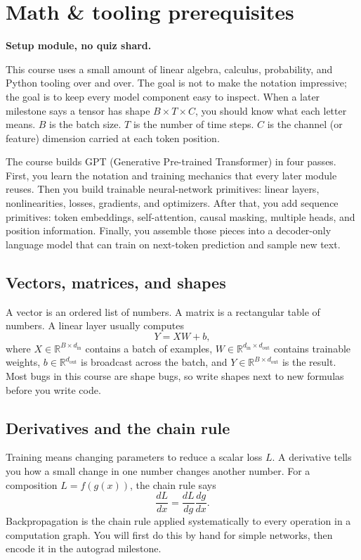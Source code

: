 \section{Math \& tooling prerequisites}\label{sec:00}
\noindent\textbf{Setup module, no quiz shard.}

This course uses a small amount of linear algebra, calculus, probability, and
Python tooling over and over. The goal is not to make the notation impressive;
the goal is to keep every model component easy to inspect. When a later
milestone says a tensor has shape $B \times T \times C$, you should know what
each letter means. $B$ is the batch size. $T$ is the number of time steps. $C$
is the channel (or feature) dimension carried at each token position.

The course builds GPT (Generative Pre-trained Transformer) in four passes.
First, you learn the notation and
training mechanics that every later module reuses. Then you build trainable
neural-network primitives: linear layers, nonlinearities, losses, gradients, and
optimizers. After that, you add sequence primitives: token embeddings,
self-attention, causal masking, multiple heads, and position information.
Finally, you assemble those pieces into a decoder-only language model that can
train on next-token prediction and sample new text.

\subsection*{Vectors, matrices, and shapes}
A vector is an ordered list of numbers. A matrix is a rectangular table of
numbers. A linear layer usually computes
\[
  Y = XW + b,
\]
where $X \in \mathbb{R}^{B \times d_{\text{in}}}$ contains a batch of examples,
$W \in \mathbb{R}^{d_{\text{in}} \times d_{\text{out}}}$ contains trainable
weights, $b \in \mathbb{R}^{d_{\text{out}}}$ is broadcast across the batch, and
$Y \in \mathbb{R}^{B \times d_{\text{out}}}$ is the result. Most bugs in this
course are shape bugs, so write shapes next to new formulas before you write
code.

\subsection*{Derivatives and the chain rule}
Training means changing parameters to reduce a scalar loss $L$. A derivative
tells you how a small change in one number changes another number. For a
composition $L=f(g(x))$, the chain rule says
\[
  \frac{dL}{dx} = \frac{dL}{dg}\frac{dg}{dx}.
\]
Backpropagation is the chain rule applied systematically to every operation in
a computation graph. You will first do this by hand for simple networks, then
encode it in the autograd milestone.

